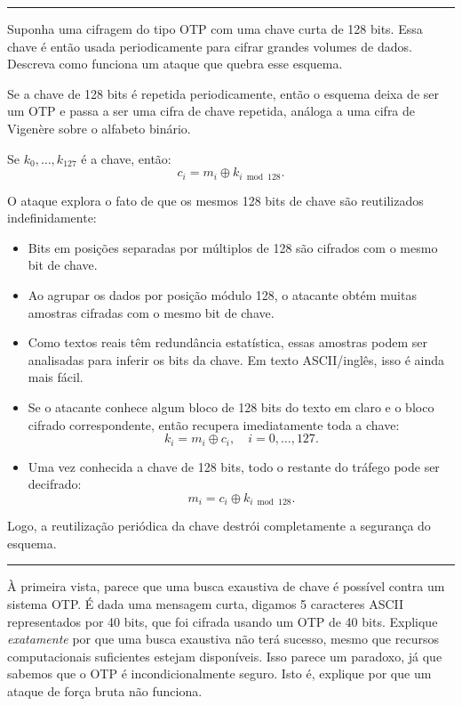 \documentclass[12pt,a4paper]{article}
\newcommand{\exercicio}[1]{%
    \par\vspace{1.2em}
    \noindent
    {\color{black!55}\rule[-0.25em]{3pt}{1.6em}}%
    \hspace{0.6em}{\Large\bfseries Exerc\'{i}cio #1}
    \par\vspace{-0.4em}
    \noindent{\color{black!35}\rule{\textwidth}{0.4pt}}
    \par\vspace{0.35em}
}
\newenvironment{resposta}{%
    \begin{respostabox}
    \color{red!70!black}\sloppy
}{%
    \end{respostabox}
}
\begin{document}
\exercicio{3}
Suponha uma cifragem do tipo OTP com uma chave curta de 128 bits. Essa chave é então usada periodicamente para cifrar grandes volumes de dados. Descreva como funciona um ataque que quebra esse esquema.

\begin{resposta}

Se a chave de 128 bits é repetida periodicamente, então o esquema deixa de ser um OTP e passa a ser uma cifra de chave repetida, análoga a uma cifra de Vigenère sobre o alfabeto binário.

Se $k_0,\ldots,k_{127}$ é a chave, então:
\[
c_i = m_i \oplus k_{i \bmod 128}.
\]

O ataque explora o fato de que os mesmos 128 bits de chave são reutilizados indefinidamente:

\begin{itemize}
    \item Bits em posições separadas por múltiplos de 128 são cifrados com o mesmo bit de chave.
    \item Ao agrupar os dados por posição módulo 128, o atacante obtém muitas amostras cifradas com o mesmo bit de chave.
    \item Como textos reais têm redundância estatística, essas amostras podem ser analisadas para inferir os bits da chave. Em texto ASCII/inglês, isso é ainda mais fácil.
    \item Se o atacante conhece algum bloco de 128 bits do texto em claro e o bloco cifrado correspondente, então recupera imediatamente toda a chave:
    \[
    k_i = m_i \oplus c_i, \quad i=0,\ldots,127.
    \]
    \item Uma vez conhecida a chave de 128 bits, todo o restante do tráfego pode ser decifrado:
    \[
    m_i = c_i \oplus k_{i \bmod 128}.
    \]
\end{itemize}

Logo, a reutilização periódica da chave destrói completamente a segurança do esquema.
\end{resposta}

\exercicio{4}
À primeira vista, parece que uma busca exaustiva de chave é possível contra um sistema OTP. É dada uma mensagem curta, digamos 5 caracteres ASCII representados por 40 bits, que foi cifrada usando um OTP de 40 bits. Explique \emph{exatamente} por que uma busca exaustiva não terá sucesso, mesmo que recursos computacionais suficientes estejam disponíveis. Isso parece um paradoxo, já que sabemos que o OTP é incondicionalmente seguro. Isto é, explique por que um ataque de força bruta não funciona.
\end{document}
